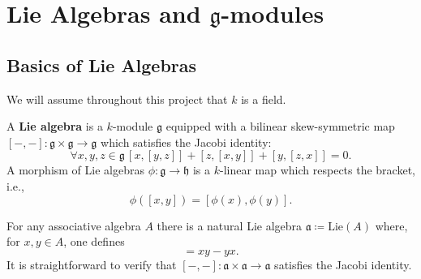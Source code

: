 \section{Lie Algebras and $ \mathfrak{g} $-modules} %
\label{sec:Lie Algebras}
\subsection{Basics of Lie Algebras} %
\label{sub:Basics of Lie Algebras}
We will assume throughout this project that $ k $ is a field.
\begin{definition}
  A \textbf{Lie algebra} is a $ k $-module $ \mathfrak{g} $ equipped with a bilinear skew-symmetric map $ [-,-]: \mathfrak{g} \times \mathfrak{g} \to \mathfrak{g} $ which satisfies the Jacobi identity:
  \begin{equation}
    \forall x,y,z \in \mathfrak{g}\, [x,[y,z]] + [z, [x, y]] + [y, [z, x]] = 0
    \label{eq:jacobi}
  .\end{equation}
  A morphism of Lie algebras $ \phi: \mathfrak{g} \to \mathfrak{h} $ is a $ k $-linear map which respects the bracket, i.e.,
  \begin{equation}
    \phi([x,y]) = [\phi(x), \phi(y)].
    \label{eq:liehom}
  \end{equation}
\end{definition}

For any associative algebra $ A $ there is a natural Lie algebra $ \mathfrak{a}\coloneqq \text{Lie}(A) $ where, for $ x,y \in A $, one defines
\begin{equation*}
  [x,y] = xy - yx
.\end{equation*}
It is straightforward to verify that $ [-,-]: \mathfrak{a} \times \mathfrak{a} \to \mathfrak{a} $ satisfies the Jacobi identity.

